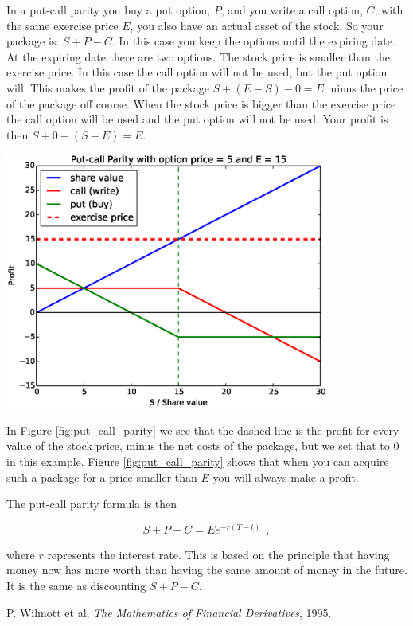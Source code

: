 \documentclass[8 pt]{article}
\newenvironment{Figure}
  {\par\medskip\noindent\minipage{\linewidth}}
  {\endminipage\par\medskip}
\begin{document}
\begin{multicols*}{2}
In a put-call parity you buy a put option, $P$, and you write a call option, $C$, with the same exercise price $E$, you also have an actual asset of the stock. So your package is: $S + P - C$. In this case you keep the options until the expiring date. At the expiring date there are two options. The stock price is smaller than the exercise price. In this case the call option will not be used, but the put option will. This makes the profit of the package $S + (E-S) - 0 = E$ minus the price of the package off course. When the stock price is bigger than the exercise price the call option will be used and the put option will not be used. Your profit is then $S + 0 -(S-E) = E$.

\begin{Figure}
  \begin{center}
    \includegraphics[width=0.8\textwidth]{graphs/put_call_parity.eps}
    \label{fig:put_call_parity}
  \end{center}
\end{Figure}

In Figure \ref{fig:put_call_parity} we see that the dashed line is the profit for every value of the stock price, minus the net costs of the package, but we set that to 0 in this example. Figure \ref{fig:put_call_parity} shows that when you can acquire such a package for a price smaller than $E$ you will always make a profit.

The put-call parity formula is then

\begin{equation*}
    S + P - C = Ee^{-r(T-t)} ~~,
\end{equation*}

where $r$ represents the interest rate. This is based on the principle that having money now has more worth than having the same amount of money in the future. It is the same as discounting $S + P - C$.

\begin{thebibliography}{28}
\raggedright
{}

 P. Wilmott et al, \emph{The Mathematics of Financial Derivatives}, 1995.

\end{thebibliography}

\end{multicols*}
\end{document}
